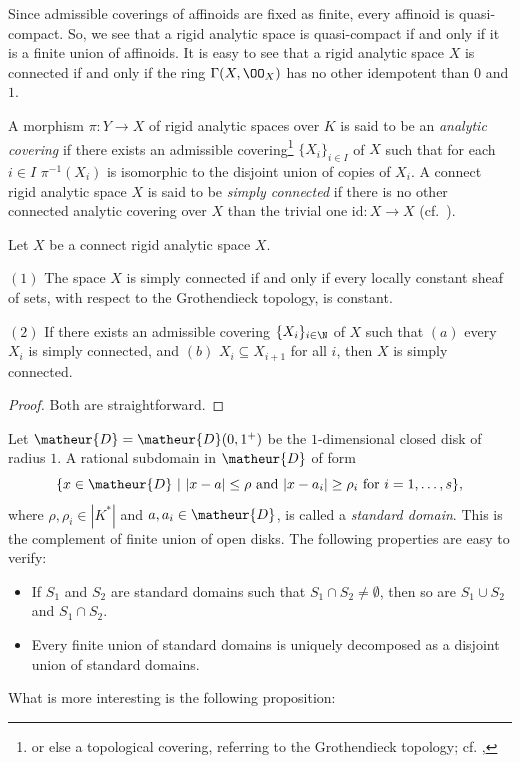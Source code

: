 Since admissible coverings of affinoids are fixed as finite, 
every affinoid is quasi-compact.
So, we see that a rigid analytic space is quasi-compact if and only if it is
a finite union of affinoids.
It is easy to see that a rigid analytic space $X$ is connected if 
and only if the ring $\Gamma(X,\OO_X)$ has no other idempotent than 
$0$ and $1$.

\begin{appdfn}
 A morphism $\pi\colon Y\rightarrow X$ of rigid analytic spaces over $K$
 is said to be an {\it analytic covering} if there exists an admissible
 covering\footnote{or else a topological covering, referring to the
 Grothendieck topology; cf. ,
 } $\{X_i\}_{i\in I}$ of $X$ such that for
 each $i\in I$ $\pi^{-1}(X_i)$ is isomorphic to the disjoint union of
 copies of $X_i$.  A connect rigid analytic space $X$ is said to be {\it
 simply connected} if there is no other connected analytic covering over
 $X$ than the trivial one $\mathrm{id}\colon X\rightarrow X$ (cf.\
 \cite{anopu}).
\end{appdfn}

\begin{applem}\label{lem-simply-connected}
Let $X$ be a connect rigid analytic space $X$.

$\mathrm{(1)}$
The space $X$ is simply connected if and only if every locally
constant sheaf of sets, with respect to the Grothendieck topology, 
is constant.

$\mathrm{(2)}$
If there exists an admissible covering $\{X_i\}_{i\in\N}$ of $X$
such that $(a)$ every $X_i$ is simply connected, and $(b)$
$X_i\subseteq X_{i+1}$ for all $i$, then $X$ is simply connected.
\end{applem}

\begin{proof}
Both are straightforward.
\end{proof}

\begin{appexa}\label{para-closed-disk}
Let $\matheur{D}=\matheur{D}(0,1^{+})$ be the $1$-dimensional closed disk of
radius $1$.
A rational subdomain in $\matheur{D}$ of form
\begin{equation*}
 \{x\in\matheur{D}\ |\ |x-a|\leq\rho\ \mathrm{and}\ |x-a_i|\geq\rho_i\ 
 \mathrm{for}\ i=1,\ldots,s\},
\end{equation*}
where $\rho,\rho_i\in |K^{\ast}|$ and $a,a_i\in\matheur{D}$, is called a
{\it standard domain}.
This is the complement of finite union of open disks.
The following properties are easy to verify:
\begin{itemize}
\item If $S_1$ and $S_2$ are standard domains such that $S_1\cap S_2
\neq\emptyset$, then so are $S_1\cup S_2$ and $S_1\cap S_2$.
\item Every finite union of standard domains is uniquely decomposed 
as a disjoint union of standard domains.
\end{itemize}

What is more interesting is the following proposition:
\end{appexa}

